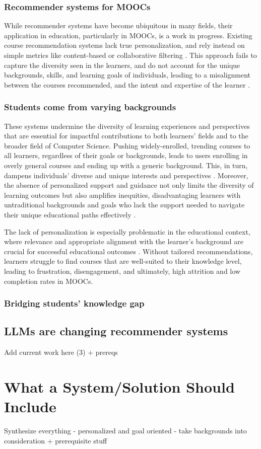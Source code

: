\subsubsection{Recommender systems for MOOCs} 

While recommender systems have become ubiquitous in many fields, their application in education, particularly in MOOCs, is a work in progress. Existing course recommendation systems lack true personalization, and rely instead on simple metrics like content-based or collaborative filtering \cite{da_silva_systematic_2023} \cite{khalid_recommender_2020}. This approach fails to capture the diversity seen in the learners, and do not account for the unique backgrounds, skills, and learning goals of individuals, leading to a misalignment between the courses recommended, and the intent and expertise of the learner \cite{noauthor_reinforced_nodate}.

\subsubsection{Students come from varying backgrounds}

These systems undermine the diversity of learning experiences and perspectives that are essential for impactful contributions to both learners' fields and to the broader field of Computer Science. Pushing widely-enrolled, trending courses to all learners, regardless of their goals or backgrounds, leads to users enrolling in overly general courses and ending up with a generic background. This, in turn, dampens individuals’ diverse and unique interests and perspectives \cite{noauthor_2022_nodate}. Moreover, the absence of personalized support and guidance not only limits the diversity of learning outcomes but also amplifies inequities, disadvantaging learners with untraditional backgrounds and goals who lack the support needed to navigate their unique educational paths effectively \cite{dumont_promise_2023}.

The lack of personalization is especially problematic in the educational context, where relevance and appropriate alignment with the learner's background are crucial for successful educational outcomes \cite{noauthor_building_2017}. Without tailored recommendations, learners struggle to find courses that are well-suited to their knowledge level, leading to frustration, disengagement, and ultimately, high attrition and low completion rates in MOOCs.

\subsubsection{Bridging students' knowledge gap}

\subsection{LLMs are changing recommender systems}

Add current work here (3) + prereqs

\section{What a System/Solution Should Include}

Synthesize everything 
- personalized and goal oriented
- take backgrounds into consideration + prerequisite stuff 
